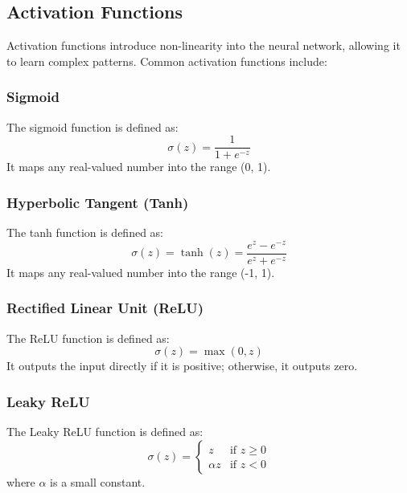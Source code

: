         \subsection{Activation Functions}

            Activation functions introduce non-linearity into the neural network, allowing it to learn complex patterns. Common activation functions include:

            \subsubsection{Sigmoid}

                The sigmoid function is defined as:
                \begin{equation}
                \sigma(z) = \frac{1}{1 + e^{-z}}
                \end{equation}
                It maps any real-valued number into the range (0, 1).

            \subsubsection{Hyperbolic Tangent (Tanh)}

                The tanh function is defined as:
                \begin{equation}
                \sigma(z) = \tanh(z) = \frac{e^z - e^{-z}}{e^z + e^{-z}}
                \end{equation}
                It maps any real-valued number into the range (-1, 1).

            \subsubsection{Rectified Linear Unit (ReLU)}

                The ReLU function is defined as:
                \begin{equation}
                \sigma(z) = \max(0, z)
                \end{equation}
                It outputs the input directly if it is positive; otherwise, it outputs zero.

            \subsubsection{Leaky ReLU}

                The Leaky ReLU function is defined as:
                \begin{equation}
                \sigma(z) = \begin{cases}
                z & \text{if } z \geq 0 \\
                \alpha z & \text{if } z < 0
                \end{cases}
                \end{equation}
                where \( \alpha \) is a small constant.

